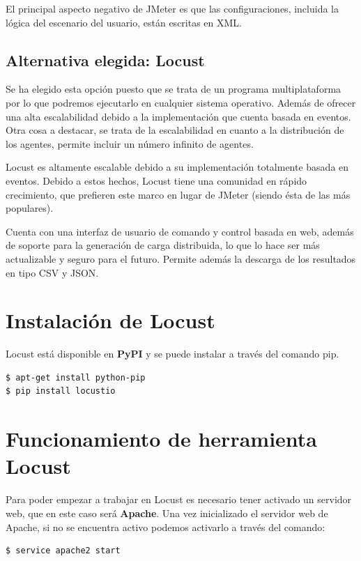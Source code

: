 El principal aspecto negativo de JMeter es que las configuraciones, incluida la lógica del escenario del usuario, están escritas en XML.

\subsection{Alternativa elegida: Locust}

Se ha elegido esta opción puesto que se trata de un programa multiplataforma por lo que podremos ejecutarlo en cualquier sistema operativo. Además de ofrecer una alta escalabilidad debido a la implementación que cuenta basada en eventos. Otra cosa a destacar, se trata de la escalabilidad en cuanto a la distribución de los agentes, permite incluir un número infinito de agentes. 

Locust es altamente escalable debido a su implementación totalmente basada en eventos. Debido a estos hechos, Locust tiene una comunidad en rápido crecimiento, que prefieren este marco en lugar de JMeter (siendo ésta de las más populares).

Cuenta con una interfaz de usuario de comando y control basada en web, además de soporte para la generación de carga distribuida, lo que lo hace ser más actualizable y seguro para el futuro.
\newpage
Permite además la descarga de los resultados en tipo CSV y JSON.

\section{Instalación de Locust}

Locust está disponible en \textbf{PyPI} y se puede instalar a través del comando pip.

\begin{lstlisting}[language=bash]
$ apt-get install python-pip
$ pip install locustio
\end{lstlisting}

\section{Funcionamiento de herramienta Locust}
Para poder empezar a trabajar en Locust es necesario tener activado un servidor web, que en este caso será \textbf{Apache}.
Una vez inicializado el servidor web de Apache, si no se encuentra activo podemos activarlo a través del comando:

\begin{lstlisting}[language=bash]
$ service apache2 start
\end{lstlisting}

